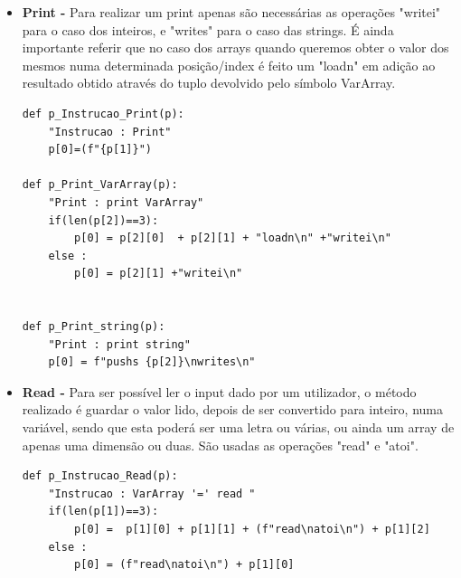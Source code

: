 \documentclass[11pt,a4paper]{report}
\begin{document}
\begin{itemize}
\begin {verbatim}
def p_Verifica_cond(p):
    "Verifica : '(' Cond ')' "
    p[0] = p[2]

def p_Verifica_naocond(p):
    "Verifica : '!' '(' Cond ')' "
    p[0] = f"{p[3]}not\n"

def p_Verifica_And(p):
    "Verifica : Verifica and Verifica"
    p[0] = f"{p[1]}{p[3]}mul\n"

def p_Verifica_Or(p):
    "Verifica : Verifica or Verifica"
    p[0] = f"{p[1]}{p[3]}add\n{p[1]}{p[3]}mul\nsub\n"

def p_Cond_Equals(p):
    "Cond : Expressao equals Expressao"
    p[0] = f"{p[1]}{p[3]}equal\n"

def p_Cond_LessEq(p):
    "Cond : Expressao lessEq Expressao"
    p[0] = f"{p[1]}{p[3]}infeq\n"

def p_Cond_MoreEq(p):
    "Cond : Expressao moreEq Expressao"
    p[0] = f"{p[1]}{p[3]}supeq\n"

def p_Cond_Menor(p):
    "Cond : Expressao '<' Expressao"
    p[0] = f"{p[1]}{p[3]}inf\n"

def p_Cond_Maior(p):
    "Cond : Expressao '>' Expressao"
    p[0] = f"{p[1]}{p[3]}sup\n"

def p_Cond_Verifica(p):
    "Cond : Verifica"
    p[0] = p[1]
\end{verbatim}



\item \textbf{Print -} Para realizar um print apenas são necessárias as operações "writei" para o caso dos inteiros, e "writes" para o caso das strings. É ainda importante referir que no caso dos arrays quando queremos obter o valor dos mesmos numa determinada posição/index é feito um "loadn" em adição ao resultado obtido através do tuplo devolvido pelo símbolo VarArray.
\begin {verbatim}
def p_Instrucao_Print(p):
    "Instrucao : Print"
    p[0]=(f"{p[1]}")

def p_Print_VarArray(p):
    "Print : print VarArray"
    if(len(p[2])==3):
        p[0] = p[2][0]  + p[2][1] + "loadn\n" +"writei\n"
    else :
        p[0] = p[2][1] +"writei\n"


def p_Print_string(p):
    "Print : print string"
    p[0] = f"pushs {p[2]}\nwrites\n"
\end{verbatim}


\item \textbf{Read -} Para ser possível ler o input dado por um utilizador, o método realizado é guardar o valor lido, depois de ser convertido para inteiro, numa variável, sendo que esta poderá ser uma letra ou várias, ou ainda um array de apenas uma dimensão ou duas. São usadas as operações "read" e "atoi".
\begin {verbatim}
def p_Instrucao_Read(p):
    "Instrucao : VarArray '=' read "
    if(len(p[1])==3):
        p[0] =  p[1][0] + p[1][1] + (f"read\natoi\n") + p[1][2]
    else :
        p[0] = (f"read\natoi\n") + p[1][0]
\end{verbatim}



\end{itemize}
\end{document}
